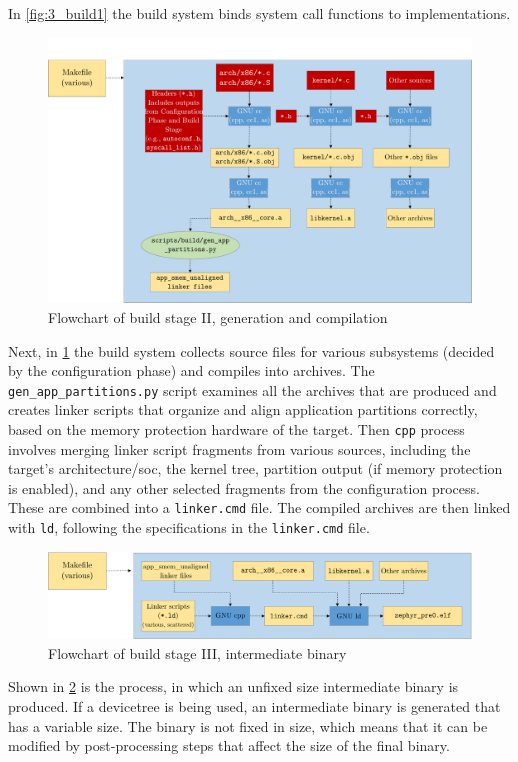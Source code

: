 In \cref{fig:3_build1} the build system binds system call functions to implementations.
\begin{figure}[htbp]
	\centering
	\includegraphics[width=.8\textwidth]{Figures/3_cmake_build2.pdf}
	\caption[Flowchart of build stage II, generation and compilation]{Flowchart of build stage II, generation and compilation}
	\label{fig:3_build2}
\end{figure}
Next, in \cref{fig:3_build2} the build system collects source files for various subsystems (decided by the configuration phase) and compiles into archives. The \texttt{gen\_app\_partitions.py} script examines all the archives that are produced and creates linker scripts that organize and align application partitions correctly, based on the memory protection hardware of the target. Then \texttt{cpp} process involves merging linker script fragments from various sources, including the target's architecture/\gls{soc}, the kernel tree, partition output (if memory protection is enabled), and any other selected fragments from the configuration process. These are combined into a \texttt{linker.cmd} file. The compiled archives are then linked with \texttt{ld}, following the specifications in the \texttt{linker.cmd} file.
\begin{figure}[htbp]
	\centering
	\includegraphics[width=.8\textwidth]{Figures/3_cmake_build3.pdf}
	\caption[Flowchart of build stage III, intermediate binary]{Flowchart of build stage III, intermediate binary}
	\label{fig:3_build3}
\end{figure}
Shown in \cref{fig:3_build3} is the process, in which an unfixed size intermediate binary is produced. If a devicetree is being used, an intermediate binary is generated that has a variable size. The binary is not fixed in size, which means that it can be modified by post-processing steps that affect the size of the final binary.
